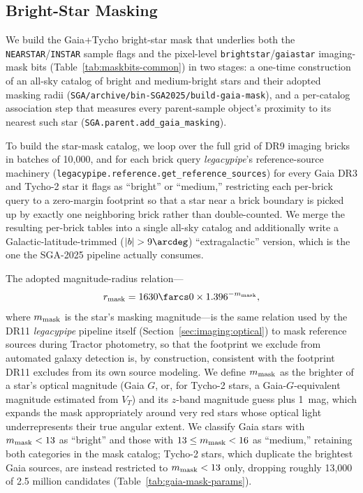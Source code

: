 \documentclass[modern,linenumbers]{aastex701}
\begin{document}


\subsection{Bright-Star Masking}
\label{sec:parent:gaiamask}

We build the Gaia+Tycho bright-star mask that underlies both the
\texttt{NEARSTAR}/\texttt{INSTAR} sample flags and the pixel-level
\texttt{brightstar}/\texttt{gaiastar} imaging-mask bits (Table~\ref{tab:maskbits-common})
in two stages: a one-time construction of an all-sky catalog of bright
and medium-bright stars and their adopted masking radii
(\texttt{SGA/archive/bin-SGA2025/build-gaia-mask}), and a per-catalog
association step that measures every parent-sample object's proximity
to its nearest such star (\texttt{SGA.parent.add\_gaia\_masking}).

To build the star-mask catalog, we loop over the full grid of DR9
imaging bricks in batches of 10,000, and for each brick query
\textsl{legacypipe}'s reference-source machinery
(\texttt{legacypipe.reference.get\_reference\_sources}) for every Gaia
DR3 and Tycho-2 star it flags as ``bright'' or ``medium,'' restricting
each per-brick query to a zero-margin footprint so that a star near a
brick boundary is picked up by exactly one neighboring brick rather
than double-counted. We merge the resulting per-brick tables into a
single all-sky catalog and additionally write a Galactic-latitude-trimmed
($|b|>9\arcdeg$) ``extragalactic'' version, which is the one the
SGA-2025 pipeline actually consumes.

The adopted magnitude-radius relation---
\begin{equation}
  r_{\rm mask} = 1630\farcs0 \times 1.396^{-m_{\rm mask}},
  \label{eq:gaiamaskradius}
\end{equation}
where $m_{\rm mask}$ is the star's masking magnitude---is the same
relation used by the DR11 \textsl{legacypipe} pipeline itself
(Section~\ref{sec:imaging:optical}) to mask reference sources during
Tractor photometry, so that the footprint we exclude from automated
galaxy detection is, by construction, consistent with the footprint
DR11 excludes from its own source modeling. We define $m_{\rm mask}$
as the brighter of a star's optical magnitude (Gaia $G$, or, for
Tycho-2 stars, a Gaia-$G$-equivalent magnitude estimated from
$V_T$) and its $z$-band magnitude guess plus 1~mag, which expands the
mask appropriately around very red stars whose optical light
underrepresents their true angular extent. We classify Gaia stars
with $m_{\rm mask}<13$ as ``bright'' and those with
$13\le m_{\rm mask}<16$ as ``medium,'' retaining both categories in the
mask catalog; Tycho-2 stars, which duplicate the brightest Gaia
sources, are instead restricted to $m_{\rm mask}<13$ only, dropping
roughly 13,000 of 2.5 million candidates (Table~\ref{tab:gaia-mask-params}).
\end{document}
